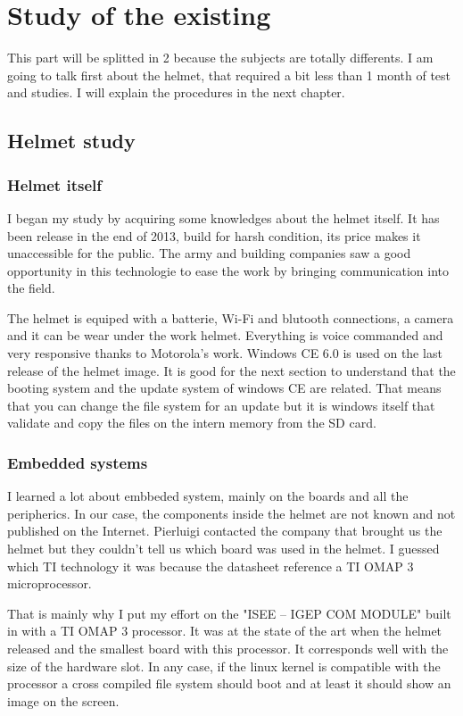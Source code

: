 \chapter[Studies]{Study of the existing}
 \par This part will be splitted in 2 because the subjects are totally differents. I am going to talk first about the helmet, that required a bit less than 1 month of test and studies. I will explain the procedures in the next chapter. 
	
	\section{Helmet study}	
	\subsection{Helmet itself}
	\par I began my study by acquiring some knowledges about the helmet itself. It has been release in the end of 2013, build for harsh condition, its price makes it unaccessible for the public. The army and building companies saw a good opportunity in this technologie to ease the work by bringing communication into the field.
	\par The helmet is equiped with a batterie, Wi-Fi and blutooth connections, a camera and it can be wear under the work helmet. Everything is voice commanded and very responsive thanks to Motorola's work. Windows CE 6.0 is used on the last release of the helmet image. It is good for the next section to understand that the booting system and the update system of windows CE are related. That means that you can change the file system for an update but it is windows itself that validate and copy the files on the intern memory from the SD card.
	\subsection{Embedded systems}
	\par I learned a lot about embbeded system, mainly on the boards and all the peripherics. In our case, the components inside the helmet are not known and not published on the Internet. Pierluigi contacted the company that brought us the helmet but they couldn't tell us which board was used in the helmet. I guessed which TI technology it was because the datasheet reference a TI OMAP 3 microprocessor. 
	\par That is mainly why I put my effort on the "ISEE – IGEP COM MODULE" built in with a TI OMAP 3 processor. It was at the state of the art when the helmet released and the smallest board with this processor. It corresponds well with the size of the hardware slot. In any case, if the linux kernel is compatible with the processor a cross compiled file system should boot and at least it should show an image on the screen.
	
